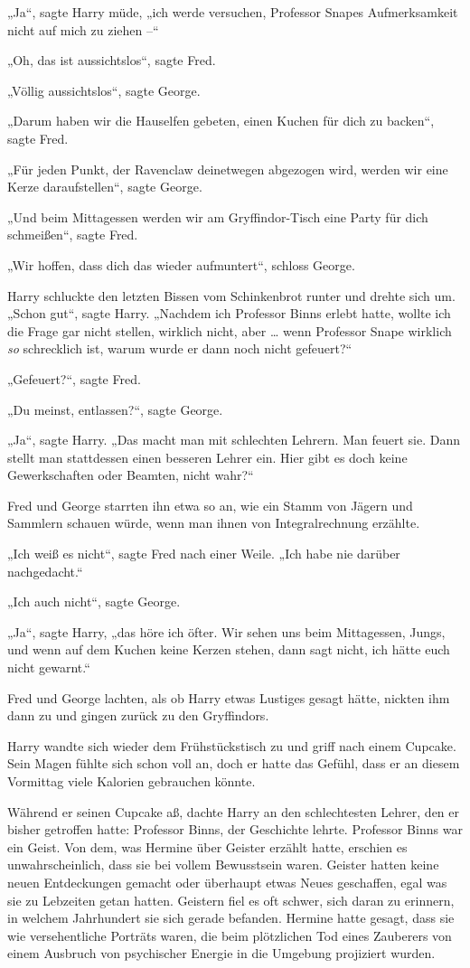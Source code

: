 „Ja“, sagte Harry müde, „ich werde versuchen, Professor Snapes Aufmerksamkeit nicht auf mich zu ziehen –“ 

„Oh, das ist aussichtslos“, sagte Fred. 

„Völlig aussichtslos“, sagte George. 

„Darum haben wir die Hauselfen gebeten, einen Kuchen für dich zu backen“, sagte Fred. 

„Für jeden Punkt, der Ravenclaw deinetwegen abgezogen wird, werden wir eine Kerze daraufstellen“, sagte George. 

„Und beim Mittagessen werden wir am Gryffindor-Tisch eine Party für dich schmeißen“, sagte Fred. 

„Wir hoffen, dass dich das wieder aufmuntert“, schloss George. 

Harry schluckte den letzten Bissen vom Schinkenbrot runter und drehte sich um. „Schon gut“, sagte Harry. „Nachdem ich Professor Binns erlebt hatte, wollte ich die Frage gar nicht stellen, wirklich nicht, aber … wenn Professor Snape wirklich \emph{so} schrecklich ist, warum wurde er dann noch nicht gefeuert?“ 

„Gefeuert?“, sagte Fred. 

„Du meinst, entlassen?“, sagte George. 

„Ja“, sagte Harry. „Das macht man mit schlechten Lehrern. Man feuert sie. Dann stellt man stattdessen einen besseren Lehrer ein. Hier gibt es doch keine Gewerkschaften oder Beamten, nicht wahr?“ 

Fred und George starrten ihn etwa so an, wie ein Stamm von Jägern und Sammlern schauen würde, wenn man ihnen von Integralrechnung erzählte. 

„Ich weiß es nicht“, sagte Fred nach einer Weile. „Ich habe nie darüber nachgedacht.“ 

„Ich auch nicht“, sagte George. 

„Ja“, sagte Harry, „das höre ich öfter. Wir sehen uns beim Mittagessen, Jungs, und wenn auf dem Kuchen keine Kerzen stehen, dann sagt nicht, ich hätte euch nicht gewarnt.“ 

Fred und George lachten, als ob Harry etwas Lustiges gesagt hätte, nickten ihm dann zu und gingen zurück zu den Gryffindors. 

Harry wandte sich wieder dem Frühstückstisch zu und griff nach einem Cupcake. Sein Magen fühlte sich schon voll an, doch er hatte das Gefühl, dass er an diesem Vormittag viele Kalorien gebrauchen könnte. 

Während er seinen Cupcake aß, dachte Harry an den schlechtesten Lehrer, den er bisher getroffen hatte: Professor Binns, der Geschichte lehrte. Professor Binns war ein Geist. Von dem, was Hermine über Geister erzählt hatte, erschien es unwahrscheinlich, dass sie bei vollem Bewusstsein waren. Geister hatten keine neuen Entdeckungen gemacht oder überhaupt etwas Neues geschaffen, egal was sie zu Lebzeiten getan hatten. Geistern fiel es oft schwer, sich daran zu erinnern, in welchem Jahrhundert sie sich gerade befanden. Hermine hatte gesagt, dass sie wie versehentliche Porträts waren, die beim plötzlichen Tod eines Zauberers von einem Ausbruch von psychischer Energie in die Umgebung projiziert wurden. 

